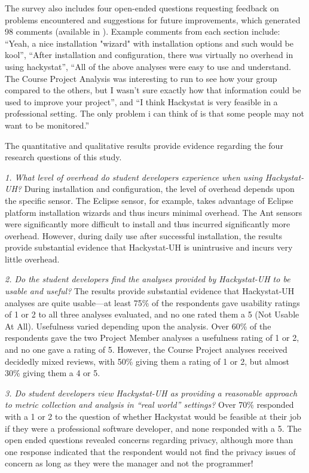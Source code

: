 \documentclass[10pt,twocolumn]{article}
\begin{document}
The survey also includes four open-ended questions requesting feedback on
problems encountered and suggestions for future improvements, which
generated 98 comments (available in \cite{csdl2-03-13}).  Example comments
from each section include: ``Yeah, a nice installation "wizard" with
installation options and such would be kool'', ``After installation and
configuration, there was virtually no overhead in using hackystat'', ``All
of the above analyses were easy to use and understand. The Course Project
Analysis was interesting to run to see how your group compared to the
others, but I wasn't sure exactly how that information could be used to
improve your project'', and ``I think Hackystat is very feasible in a
professional setting. The only problem i can think of is that some people
may not want to be monitored.''

The quantitative and qualitative results provide evidence regarding the four research
questions of this study.

{\em 1. What level of overhead do student developers experience when using
Hackystat-UH?} During installation and configuration, the level of overhead
depends upon the specific sensor. The Eclipse sensor, for example, takes
advantage of Eclipse platform installation wizards and thus incurs minimal
overhead. The Ant sensors were significantly more difficult to install and
thus incurred significantly more overhead. However, during daily use after
successful installation, the results provide substantial evidence that
Hackystat-UH is unintrusive and incurs very little overhead.

{\em 2. Do the student developers find the analyses provided by
Hackystat-UH to be usable and useful?}  The results provide substantial
evidence that Hackystat-UH analyses are quite usable---at least 75\% of
the respondents gave usability ratings of 1 or 2 to all three analyses
evaluated, and no one rated them a 5 (Not Usable At All).  Usefulness 
varied depending upon the analysis.  Over 60\% of the respondents gave the
two Project Member analyses a usefulness rating of 1 or 2, and no one gave a
rating of 5. However, the Course Project analyses received decidedly mixed
reviews, with 50\% giving them a rating of 1 or 2, but almost 30\% giving
them a 4 or 5.  

{\em  3. Do student developers view Hackystat-UH as providing a reasonable
approach to metric collection and analysis in ``real world'' settings?} 
Over 70\% responded with a 1 or 2 to the question of whether 
Hackystat would be feasible at their job if they were a professional
software developer, and none responded with a 5.  The open ended questions
revealed concerns regarding privacy, although more than one response 
indicated that the respondent would not find the privacy issues of concern
as long as they were the manager and not the programmer!
\end{document}
